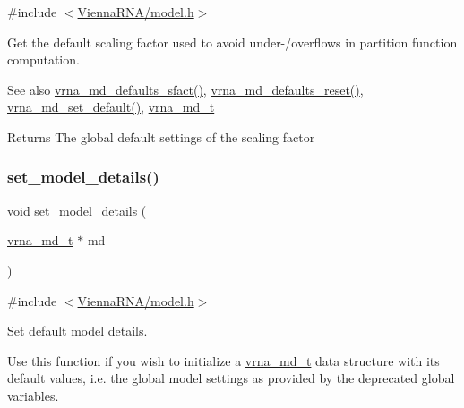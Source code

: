 {\ttfamily \#include $<$\mbox{\hyperlink{model_8h}{Vienna\+R\+N\+A/model.\+h}}$>$}



Get the default scaling factor used to avoid under-\//overflows in partition function computation. 

\begin{DoxySeeAlso}{See also}
\mbox{\hyperlink{group__model__details_ga3f73d3029d3d0025d4cc311510cd95a3}{vrna\+\_\+md\+\_\+defaults\+\_\+sfact()}}, \mbox{\hyperlink{group__model__details_ga70834424cf804d149937de89f80ceb45}{vrna\+\_\+md\+\_\+defaults\+\_\+reset()}}, \mbox{\hyperlink{group__model__details_ga8ac6ff84936282436f822644bf841f66}{vrna\+\_\+md\+\_\+set\+\_\+default()}}, \mbox{\hyperlink{group__model__details_ga1f8a10e12a0a1915f2a4eff0b28ea17c}{vrna\+\_\+md\+\_\+t}} 
\end{DoxySeeAlso}
\begin{DoxyReturn}{Returns}
The global default settings of the scaling factor 
\end{DoxyReturn}
\mbox{\label{group__model__details_gabad896c3650d420f3f3ddefc69e2bceb}} 
\subsubsection{\texorpdfstring{set\_model\_details()}{set\_model\_details()}}
{\footnotesize\ttfamily void set\+\_\+model\+\_\+details (\begin{DoxyParamCaption}\item[{\mbox{\hyperlink{group__model__details_ga1f8a10e12a0a1915f2a4eff0b28ea17c}{vrna\+\_\+md\+\_\+t}} $\ast$}]{md }\end{DoxyParamCaption})}



{\ttfamily \#include $<$\mbox{\hyperlink{model_8h}{Vienna\+R\+N\+A/model.\+h}}$>$}



Set default model details. 

Use this function if you wish to initialize a \mbox{\hyperlink{group__model__details_ga1f8a10e12a0a1915f2a4eff0b28ea17c}{vrna\+\_\+md\+\_\+t}} data structure with its default values, i.\+e. the global model settings as provided by the deprecated global variables.

